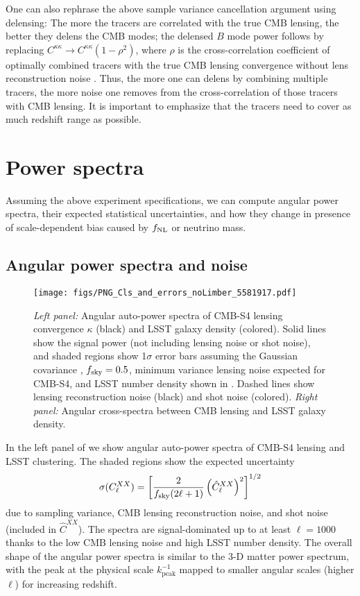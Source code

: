 \documentclass[prd,superscriptaddress,floatfix,notitlepage,nofootinbib,reprint]{revtex4-1} %
\begin{document}
One can also rephrase the above sample variance cancellation argument using delensing:
The more the tracers are correlated with the true CMB lensing, the better they delens the CMB modes; the delensed $B$ mode power follows by replacing $C^{\kappa\kappa}\rightarrow C^{\kappa\kappa}(1-\rho^2)$, where $\rho$ is the cross-correlation coefficient of optimally combined tracers with the true CMB lensing convergence without lens reconstruction noise \cite{BlakeMarcel1502}.
Thus, the more one can delens by combining multiple tracers, the more noise one removes from the cross-correlation of those tracers with CMB lensing. It is important to emphasize that the tracers need to cover as much redshift range as possible.



\section{Power spectra}
\label{se:PowerSpectra}

Assuming the above experiment specifications, we can compute angular power spectra, their expected statistical uncertainties, and how they change in presence of scale-dependent bias caused by ${f_\mathrm{NL}}$ or neutrino mass.

\subsection{Angular power spectra and noise}

\begin{figure*}[tbp]
\texttt{[image: figs/PNG\_Cls\_and\_errors\_noLimber\_5581917.pdf]}
\caption{\emph{Left panel:} Angular auto-power spectra of CMB-S4 lensing convergence $\kappa$ (black) and LSST galaxy density (colored). 
Solid lines show the signal power (not including lensing noise or shot noise), and shaded regions show 1$\sigma$ error bars assuming the Gaussian covariance , ${f_\mathrm{sky}}=0.5$, minimum variance lensing noise expected for CMB-S4, and LSST number density shown in .
Dashed lines show lensing reconstruction noise (black) and shot noise (colored).
\emph{Right panel:} Angular cross-spectra between CMB lensing and LSST galaxy density.
}
\label{fig:ClsWithNoise}
\end{figure*}



In the left panel of  we show angular auto-power spectra of CMB-S4 lensing and LSST clustering. The shaded regions show the expected uncertainty
\begin{align}
  \label{eq:34}
  \sigma(C^{XX}_\ell) = \left[\frac{2}{{f_\mathrm{sky}} (2\ell+1)}\left(\hat C^{XX}_\ell\right)^2\right]^{1/2}
\end{align}
due to sampling variance, CMB lensing reconstruction noise, and shot noise (included in $\hat C^{XX}$).
The spectra are signal-dominated up to at least $\ell=1000$ thanks to the low CMB lensing noise and high LSST number density. 
The overall shape of the angular power spectra is similar to the 3-D matter power spectrum, with the peak at the physical scale $k_\mathrm{peak}^{-1}$ mapped to smaller angular scales (higher $\ell$) for increasing redshift.
\end{document}

